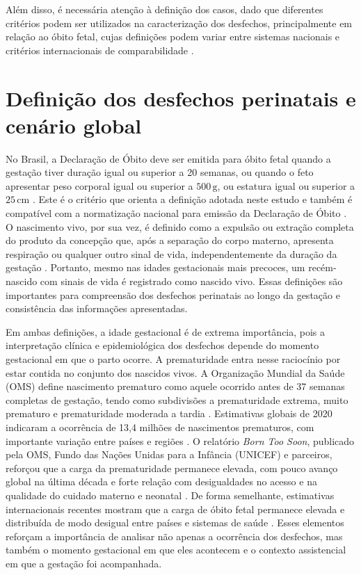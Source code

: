 Além disso, é necessária atenção à definição dos casos, dado que diferentes critérios 
podem ser utilizados na caracterização dos desfechos, principalmente em relação ao 
óbito fetal, cujas definições podem variar entre sistemas nacionais e critérios 
internacionais de comparabilidade \cite{Andrade2005,Lawn2016}.

\section{Definição dos desfechos perinatais e cenário global}

No Brasil, a Declaração de Óbito deve ser emitida para óbito fetal quando a
gestação tiver duração igual ou superior a 20 semanas, ou quando o feto
apresentar peso corporal igual ou superior a $500\,\text{g}$, ou estatura igual
ou superior a $25\,\text{cm}$ \cite{ministerioSaudeDO2022}. Este é o critério
que orienta a definição adotada neste estudo e também é compatível com a
normatização nacional para emissão da Declaração de Óbito \cite{Andrade2005}. O 
nascimento vivo, por sua vez, é definido como a expulsão ou extração completa 
do produto da concepção que, após a separação do corpo materno, apresenta 
respiração ou qualquer outro sinal de vida, independentemente da duração da 
gestação \cite{ministerioSaudeDNV2022}. Portanto, mesmo nas idades gestacionais 
mais precoces, um recém-nascido com sinais de vida é registrado como nascido 
vivo. Essas definições são importantes para compreensão dos desfechos perinatais 
ao longo da gestação e consistência das informações apresentadas.

Em ambas definições, a idade gestacional é de extrema importância, pois a interpretação 
clínica e epidemiológica dos desfechos depende do momento gestacional em que o parto 
ocorre. A prematuridade entra nesse raciocínio por estar contida no conjunto dos
nascidos vivos. A Organização Mundial da Saúde (OMS) define nascimento prematuro
como aquele ocorrido antes de 37 semanas completas de gestação, tendo como subdivisões 
a prematuridade extrema, muito prematuro e prematuridade moderada a tardia
\cite{WHO2023Preterm}. Estimativas globais de 2020 indicaram a ocorrência de 13,4 
milhões de nascimentos prematuros, com importante variação entre países e
regiões \cite{Ohuma2023PretermEstimates}. O relatório \textit{Born Too Soon},
publicado pela OMS, Fundo das Nações Unidas para a Infância (UNICEF) e
parceiros, reforçou que a carga da prematuridade permanece elevada, com pouco
avanço global na última década e forte relação com desigualdades no acesso e na
qualidade do cuidado materno e neonatal \cite{BornTooSoon2023}. De forma semelhante, 
estimativas internacionais recentes mostram que a carga de óbito fetal permanece 
elevada e distribuída de modo desigual entre países e sistemas de saúde \cite{Lawn2016,UnitedNationsChildMortality,Neglectedt}. 
Esses elementos reforçam a importância de analisar não apenas a ocorrência dos desfechos, 
mas também o momento gestacional em que eles acontecem e o contexto assistencial 
em que a gestação foi acompanhada.

